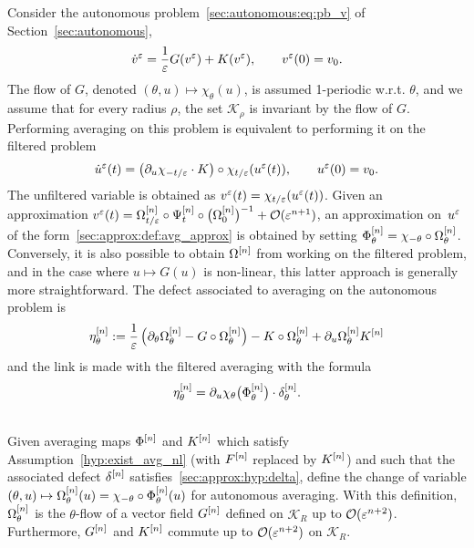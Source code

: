 Consider the autonomous problem~\eqref{sec:autonomous:eq:pb_v} of
Section~\ref{sec:autonomous}, 
\begin{equation*}
  \dot v^\varepsilon = \frac{1}{\varepsilon}G(v^\varepsilon) + K(v^\varepsilon),
  \qquad
  v^\varepsilon(0) = v_0 .
\end{equation*}
The flow of $G$, denoted $(\theta,u) \mapsto \chi_\theta(u)$, is assumed
1-periodic w.r.t. $\theta$, and we assume that for every radius $\rho$,
the set $\mathcal{K}_\rho$ is invariant by the flow of $G$. Performing
averaging on this problem is equivalent to performing it on the filtered
problem 
\begin{equation*}
  \dot u^\varepsilon(t) = \big( \partial_u \chi_{-t/\varepsilon} \cdot K \big) 
    \circ \chi_{t/\varepsilon} (u^\varepsilon(t)),
  \qquad
  u^\varepsilon(0) = v_0 .
\end{equation*}
The unfiltered variable is obtained as $v^\varepsilon(t) =
\chi_{t/\varepsilon}(u^\varepsilon(t) )$. Given an approximation $v^\varepsilon(t) = \Omega^{[n]} _{t/\varepsilon} \circ \Psi^{[n]} _t \circ \big( \Omega^{[n]} _0 \big)^{-1} +
\mathcal{O}(\varepsilon^{n+1} )$, an approximation on~$u^\varepsilon$ of the
form~\eqref{sec:approx:def:avg_approx} is obtained by setting $\Phi^{[n]}
_\theta = \chi_{-\theta} \circ \Omega^{[n]} _\theta$. Conversely, it is
also possible to obtain $\Omega^{[n]}$ from working on the filtered
problem, and in the case where $u \mapsto G(u)$ is non-linear, this latter
approach is generally more straightforward. The defect associated to 
averaging on the autonomous problem is 
\begin{equation} \label{sec:approx:def:eta}
  \eta^{[n]}_{\theta} 
  := \frac{1}{\varepsilon} \left( \partial_\theta \Omega^{[n]} _\theta 
  - G \circ \Omega^{[n]} _\theta \right) 
  - K \circ \Omega^{[n]} _\theta + \partial_u \Omega^{[n]} _\theta K^{[n]} 
\end{equation}
and the link is made with the filtered averaging with the formula 
\begin{equation*}
  \eta^{[n]} _\theta = \partial_u \chi _\theta \big( \Phi^{[n]} _\theta \big)
  \cdot \delta^{[n]} _\theta .
\end{equation*}



\begin{proposition} \label{sec:approx:thm:commut} \hspace*{1em} 
\\
  Given averaging maps $\Phi^{[n]}$ and $K^{[n]}$ which satisfy
  Assumption~\ref{hyp:exist_avg_nl} (with $F^{[n]}$ replaced by $K^{[n]}$)
  and such that the associated defect $\delta^{[n]}$
  satisfies~\eqref{sec:approx:hyp:delta}, define the change of variable
  $(\theta, u) \mapsto \Omega^{[n]} _\theta(u) = \chi _{-\theta} \circ
  \Phi^{[n]} _\theta(u)$ for autonomous averaging. With this definition,
  $\Omega^{[n]} _\theta$ is the $\theta$-flow of a vector field $G^{[n]}$
  defined on $\mathcal{K}_R$ up to $\mathcal{O}(\varepsilon^{n+2})$. Furthermore, $G^{[n]}$ and $K^{[n]}$ commute up to $\mathcal{O}(\varepsilon^{n+2})$ on $\mathcal{K}_{R}$. 
\end{proposition}

